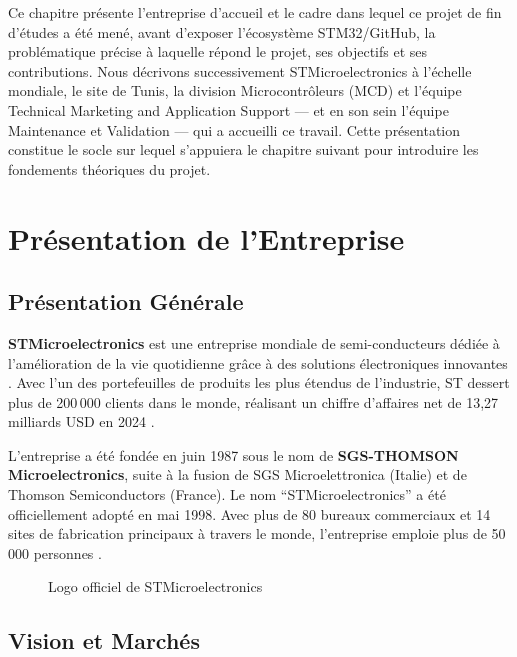 \documentclass[12pt,a4paper]{report}
\begin{document}
Ce chapitre présente l'entreprise d'accueil et le cadre dans lequel ce projet de fin d'études a été mené, avant d'exposer l'écosystème STM32/GitHub, la problématique précise à laquelle répond le projet, ses objectifs et ses contributions. Nous décrivons successivement STMicroelectronics à l'échelle mondiale, le site de Tunis, la division Microcontrôleurs (MCD) et l'équipe Technical Marketing and Application Support --- et en son sein l'équipe Maintenance et Validation --- qui a accueilli ce travail. Cette présentation constitue le socle sur lequel s'appuiera le chapitre suivant pour introduire les fondements théoriques du projet.

\section{Présentation de l'Entreprise}
\label{sec:st_presentation}

\subsection{Présentation Générale}

\textbf{STMicroelectronics} est une entreprise mondiale de semi-conducteurs dédiée à l'amélioration de la vie quotidienne grâce à des solutions électroniques innovantes \cite{stm32}. Avec l'un des portefeuilles de produits les plus étendus de l'industrie, ST dessert plus de 200\,000 clients dans le monde, réalisant un chiffre d'affaires net de 13,27 milliards USD en 2024 \cite{st_annual_report}.

L'entreprise a été fondée en juin 1987 sous le nom de \textbf{SGS-THOMSON Microelectronics}, suite à la fusion de SGS Microelettronica (Italie) et de Thomson Semiconductors (France). Le nom ``STMicroelectronics'' a été officiellement adopté en mai 1998. Avec plus de 80 bureaux commerciaux et 14 sites de fabrication principaux à travers le monde, l'entreprise emploie plus de 50\,000 personnes \cite{st_annual_report}.

\begin{figure}[H]
\centering
{}
\caption{Logo officiel de STMicroelectronics}
\label{fig:st_logo}
\end{figure}

\subsection{Vision et Marchés}
\end{document}
